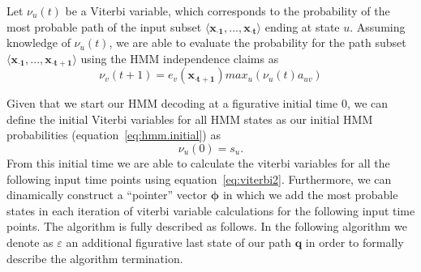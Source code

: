 Let $ \nu_u(t) $ be a Viterbi variable, which corresponds to the probability of the most probable path of the input subset $ \langle \mathbf{{x}_{\cdot 1}}, ..., \mathbf{{x}_{\cdot t}} \rangle $ ending at state $ u $. Assuming knowledge of $ \nu_u(t) $, we are able to evaluate the probability for the path subset $ \langle \mathbf{{x}_{\cdot 1}}, ..., \mathbf{{x}_{\cdot t+1}} \rangle $ using the HMM independence claims as
\begin{equation}
  \label{eq:viterbi2}
  \nu_v(t+1) = e_v(\mathbf{{x}_{\cdot t+1}}) {max}_u(\nu_u(t) a_{uv})
\end{equation}

Given that we start our HMM decoding at a figurative initial time $ 0 $, we can define the initial Viterbi variables for all HMM states as our initial HMM probabilities (equation~\ref{eq:hmm.initial}) as
\begin{equation}
  \label{eq:viterbi3}
  \nu_u(0) = s_u.
\end{equation}
From this initial time we are able to calculate the viterbi variables for all the following input time points using equation~\ref{eq:viterbi2}. Furthermore, we can dinamically construct a ``pointer'' vector $\boldsymbol\phi$ in which we add the most probable states in each iteration of viterbi variable calculations for the following input time points. The algorithm is fully described as follows. In the following algorithm we denote as $ \varepsilon $ an additional figurative last state of our path $ \mathbf{q} $ in order to formally describe the algorithm termination.

